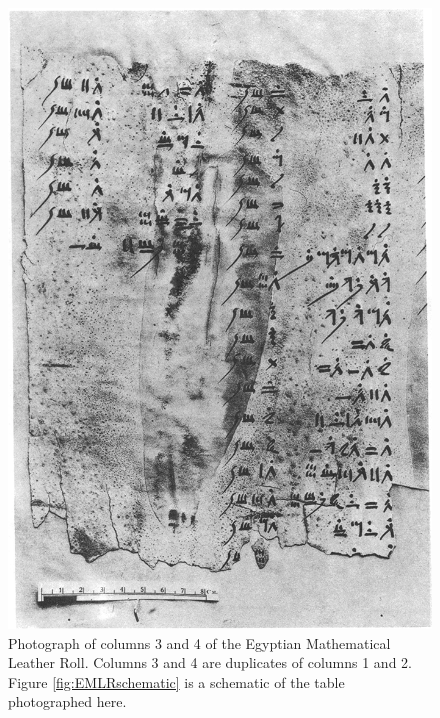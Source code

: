 \begin{figure}
  \centering
  \includegraphics[width=\textwidth]{gfx/EMLR}
  \caption[Photograph of columns 3 and 4 of the Egyptian Mathematical Leather Roll.]
  {Photograph of columns 3 and 4 of the Egyptian Mathematical Leather Roll. Columns 3 and 4 are duplicates of columns 1 and 2. Figure \ref{fig:EMLRschematic} is a schematic of the table photographed here.}
  \label{fig:EMLR}
\end{figure}

